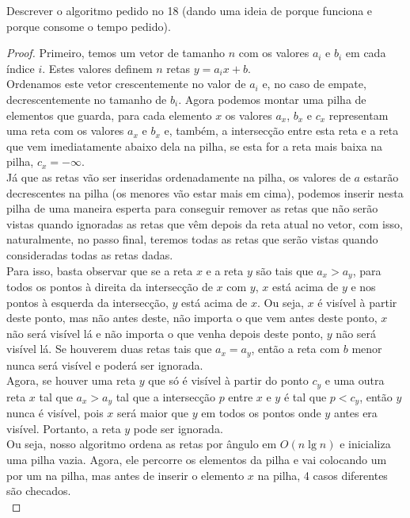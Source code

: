 \documentclass[12pt]{article}
\newenvironment{problem}[2][Ex]{\begin{trivlist}
\item[\hskip \labelsep {\bfseries #1}\hskip \labelsep {\bfseries #2.}]}{\end{trivlist}}
\begin{document}
\begin{problem}{15}
Descrever o algoritmo pedido no 18 (dando uma ideia de porque funciona e porque consome o tempo pedido).
\end{problem}

\begin{proof}
Primeiro, temos um vetor de tamanho $n$ com os valores $a_i$ e $b_i$ em cada índice $i$. Estes valores definem $n$ retas $y = a_i x + b$. \\
Ordenamos este vetor crescentemente no valor de $a_i$ e, no caso de empate, decrescentemente no tamanho de $b_i$. Agora podemos montar uma pilha de elementos que guarda, para cada elemento $x$ os valores $a_x$, $b_x$ e $c_x$ representam uma reta com os valores $a_x$ e $b_x$ e, também, a intersecção entre esta reta e a reta que vem imediatamente abaixo dela na pilha, se esta for a reta mais baixa na pilha, $c_x = -\infty$. \\
Já que as retas vão ser inseridas ordenadamente na pilha, os valores de $a$ estarão decrescentes na pilha (os menores vão estar mais em cima), podemos inserir nesta pilha de uma maneira esperta para conseguir remover as retas que não serão vistas quando ignoradas as retas que vêm depois da reta atual no vetor, com isso, naturalmente, no passo final, teremos todas as retas que serão vistas quando consideradas todas as retas dadas. \\
Para isso, basta observar que se a reta $x$ e a reta $y$ são tais que $a_x > a_y$, para todos os pontos à direita da intersecção de $x$ com $y$, $x$ está acima de $y$ e nos pontos à esquerda da intersecção, $y$ está acima de $x$. Ou seja, $x$ é visível à partir deste ponto, mas não antes deste, não importa o que vem antes deste ponto, $x$ não será visível lá e não importa o que venha depois deste ponto, $y$ não será visível lá. Se houverem duas retas tais que $a_x = a_y$, então a reta com $b$ menor nunca será visível e poderá ser ignorada. \\
Agora, se houver uma reta $y$ que só é visível à partir do ponto $c_y$ e uma outra reta $x$ tal que $a_x > a_y$ tal que a intersecção $p$ entre $x$ e $y$ é tal que $p < c_y$, então $y$ nunca é visível, pois $x$ será maior que $y$ em todos os pontos onde $y$ antes era visível. Portanto, a reta $y$ pode ser ignorada. \\
Ou seja, nosso algoritmo ordena as retas por ângulo em $O(n \lg n)$ e inicializa uma pilha vazia. Agora, ele percorre os elementos da pilha e vai colocando um por um na pilha, mas antes de inserir o elemento $x$ na pilha, 4 casos diferentes são checados. \\

\end{proof}
\end{document}
